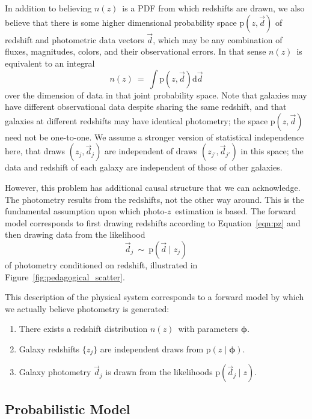 \documentclass[iop]{emulateapj}
\newcommand{\Eq}[1]{Equation~\ref{#1}}
\newcommand{\data}{\ensuremath{\vec{d}}}%
\newcommand{\pr}[1]{\ensuremath{\mathrm{p}(#1)}}%
\newcommand{\gvn}{\mid}%
\newcommand{\integral}[2]{\ensuremath{\int #1 \mathrm{d} #2}}
\newcommand{\pz}{photo-$z$}
\newcommand{\nz}{$n(z)$}
\newcommand{\bvec}[1]{\ensuremath{\boldsymbol{#1}}}%
\newcommand{\ndphi}{\bvec{\phi}}
\begin{document}
In addition to believing \nz\ is a PDF from which redshifts are drawn, we also believe that there is some higher dimensional probability space $\pr{z, \data}$ of redshift and photometric data vectors $\data$, which may be any combination of fluxes, magnitudes, colors, and their observational errors.
In that sense \nz\ is equivalent to an integral
\begin{equation}
\label{eqn:integral}
n(z)\ =\ \integral{\pr{z, \data}}{\data}
\end{equation}
over the dimension of data in that joint probability space.
Note that galaxies may have different observational data despite sharing the same redshift, and that galaxies at different redshifts may have identical photometry; the space $\pr{z, \data}$ need not be one-to-one.
We assume a stronger version of statistical independence here, that draws $(z_{j}, \data_{j})$ are independent of draws $(z_{j'}, \data_{j'})$ in this space; the data and redshift of each galaxy are independent of those of other galaxies.

However, this problem has additional causal structure that we can acknowledge.
The photometry results from the redshifts, not the other way around.
This is the fundamental assumption upon which \pz\ estimation is based.
The forward model corresponds to first drawing redshifts according to \Eq{eqn:pz} and then drawing data from the likelihood
\begin{equation}
\label{eqn:pzpdf}
\data_{j}\ \sim\ \pr{\data \gvn z_{j}}
\end{equation}
of photometry conditioned on redshift, illustrated in Figure~\ref{fig:pedagogical_scatter}.

This description of the physical system corresponds to a forward model by which we actually believe photometry is generated:
\begin{enumerate}
	\item There exists a redshift distribution \nz\ with parameters $\ndphi$.
	\item Galaxy redshifts $\{z_{j}\}$ are independent draws from $\pr{z \gvn \ndphi}$.
	\item Galaxy photometry $\data_{j}$ is drawn from the likelihoods $\pr{\data_{j} \gvn z}$.
\end{enumerate}

\subsection{Probabilistic Model}
\label{sec:prob}
\end{document}

